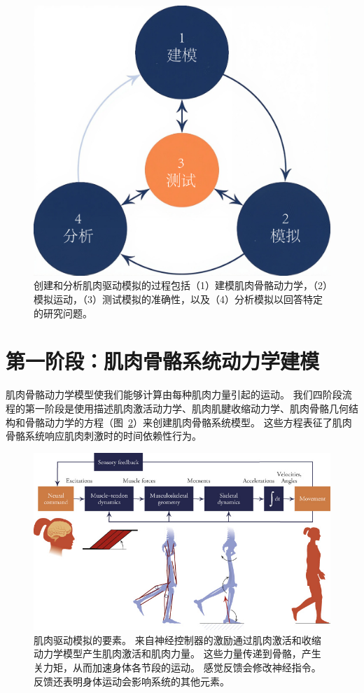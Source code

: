 \begin{figure}[!htb]
	\centering
	\includegraphics[width=0.5\linewidth]{chap10/10_3}
	\caption{创建和分析肌肉驱动模拟的过程包括（1）建模肌肉骨骼动力学，（2）模拟运动，（3）测试模拟的准确性，以及（4）分析模拟以回答特定的研究问题。 \label{fig:10_3}}
\end{figure}


\section{第一阶段：肌肉骨骼系统动力学建模}

肌肉骨骼动力学模型使我们能够计算由每种肌肉力量引起的运动。
我们四阶段流程的第一阶段是使用描述肌肉激活动力学、肌肉肌腱收缩动力学、肌肉骨骼几何结构和骨骼动力学的方程（图~\ref{fig:10_4}）来创建肌肉骨骼系统模型。
这些方程表征了肌肉骨骼系统响应肌肉刺激时的时间依赖性行为。

\begin{figure}[!htb]
	\centering
	\includegraphics[width=1.0\linewidth]{chap10/10_4}
	\caption{肌肉驱动模拟的要素。
		来自神经控制器的激励通过肌肉激活和收缩动力学模型产生肌肉激活和肌肉力量。
		这些力量传递到骨骼，产生关力矩，从而加速身体各节段的运动。
		感觉反馈会修改神经指令。
		反馈还表明身体运动会影响系统的其他元素。 \label{fig:10_4}}
\end{figure}

